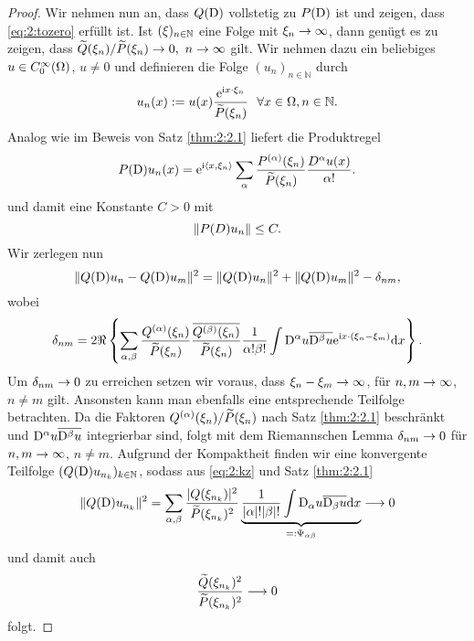 \begin{proof}
Wir nehmen nun an, dass $Q(\mathrm D)$ vollstetig zu $P(\mathrm D)$ ist und zeigen, dass \eqref{eq:2:tozero} erfüllt ist.
 Ist $(\xi)_{n \in \mathbb{N}}$ eine Folge mit $\xi_n \rightarrow \infty$, dann genügt es zu zeigen, dass $\widetilde{Q}(\xi_{n})/\widetilde{P}(\xi_{n})\to0, \ n \rightarrow \infty$ gilt.
Wir nehmen dazu ein beliebiges $u\in C^\infty_0(\Omega)$, $u\neq0$ und definieren die Folge $(u_n)_{n \in \mathbb{N}}$ durch
\begin{equation}
u_n(x):=u(x)\frac{\mathrm e^{\mathrm i x \cdot \xi_n}}{\widetilde{P}(\xi_n)}\ \ \forall x \in \Omega, n \in \mathbb{N}.
\end{equation}
Analog wie im Beweis von Satz \ref{thm:2:2.1} liefert die Produktregel
\begin{equation}
P(\mathrm D)u_n(x)=\mathrm e^{\mathrm i\langle x,\xi_n\rangle}\sum_\alpha\frac{P^{(\alpha)}(\xi_n)}{\widetilde{P}(\xi_n)}\frac{D^\alpha u(x)}{\alpha!}.
\end{equation}
und damit eine Konstante $C>0$ mit
\begin{equation}\label{eq:2:PDunb}
\lVert P(D)u_n\rVert\leq C.
\end{equation}
Wir zerlegen nun
\begin{equation}\label{eq:2:kz}
\lVert Q(\mathrm D)u_n-Q(\mathrm D)u_m\rVert^2=\lVert Q(\mathrm D)u_n\rVert^2+\lVert Q(\mathrm D)u_m\rVert^2-\delta_{nm},
\end{equation}
wobei
\begin{equation}
\delta_{nm}=2\Re\left\{\sum_{\alpha,\beta}\frac{Q^{(\alpha)}(\xi_n)}{\widetilde{P}(\xi_n)}\frac{\overline{Q^{(\beta)}(\xi_n)}}{\widetilde{P}(\xi_n)}
\frac1{\alpha!\beta!}\int \mathrm D^\alpha u\overline{\mathrm D^\beta u}\mathrm e^{\mathrm i x \cdot(\xi_n-\xi_m)}\mathrm{d} x\right\}.
\end{equation}
Um $\delta_{nm}\to0$ zu erreichen setzen wir voraus, dass $\xi_n-\xi_m\to\infty$, für $n,m\to\infty$, $n\neq m$ gilt. Ansonsten kann man ebenfalls eine entsprechende Teilfolge betrachten.
Da die Faktoren $Q^{(\alpha)}(\xi_n)/\widetilde{P}(\xi_n)$ nach Satz \ref{thm:2:2.1} beschränkt und $\mathrm D^\alpha u\overline{\mathrm D^\beta u}$ integrierbar sind, folgt mit dem Riemannschen Lemma $\delta_{nm}\to0$ für $n,m\to\infty$, $n\neq m$.
Aufgrund der Kompaktheit finden wir eine konvergente Teilfolge $(Q(\mathrm D)u_{n_k})_{k \in \mathbb{N}}$, sodass aus \eqref{eq:2:kz} und Satz \ref{thm:2:2.1}
\begin{equation}
\lVert Q(\mathrm D)u_{n_k}\rVert^2=\sum_{\alpha,\beta}\frac{\lvert Q(\xi_{n_k})\rvert^2}{\widetilde{P}(\xi_{n_k})^2} \underbrace{\frac{1}{|\alpha|! |\beta|!}\int \mathrm D_\alpha u \overline{\mathrm D_\beta u} \mathrm{d}x}_{=:\Psi_{\alpha \beta}} \longrightarrow 0
\end{equation}
und damit auch 
\begin{equation}
\frac{\widetilde{Q}(\xi_{n_k})^2}{\widetilde{P}(\xi_{n_k})^2} \longrightarrow 0
\end{equation}
folgt.
\end{proof}
